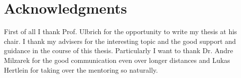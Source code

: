\section*{Acknowledgments}

First of all I thank Prof. Ulbrich for the opportunity to write my thesis at his chair.
I thank my advisers for the interesting topic and the good support and guidance in the course of this thesis. Particularly I want to thank Dr. Andre Milzarek for the good communication even over longer distances and Lukas Hertlein for taking over the mentoring so naturally.


